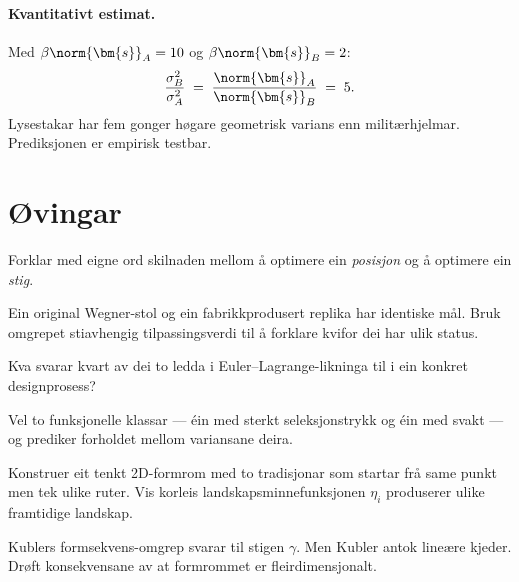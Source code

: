 \paragraph{Kvantitativt estimat.}
Med $\beta \norm{\bm{s}}_A = 10$ og
$\beta \norm{\bm{s}}_B = 2$:
\[
  \frac{\sigma^2_B}{\sigma^2_A}
  \;=\; \frac{\norm{\bm{s}}_A}{\norm{\bm{s}}_B}
  \;=\; 5.
\]
Lysestakar har fem gonger høgare geometrisk varians enn
militærhjelmar. Prediksjonen er empirisk testbar.


\section{Øvingar}

\begin{exercise}[Nivå 1]\label{ex:8.1}
Forklar med eigne ord skilnaden mellom å optimere ein
\emph{posisjon} og å optimere ein \emph{stig}.
\end{exercise}

\begin{exercise}[Nivå 1]\label{ex:8.2}
Ein original Wegner-stol og ein fabrikkprodusert replika har
identiske mål. Bruk omgrepet stiavhengig tilpassingsverdi til å
forklare kvifor dei har ulik status.
\end{exercise}

\begin{exercise}[Nivå 2]\label{ex:8.3}
Kva svarar kvart av dei to ledda i Euler--Lagrange-likninga til i
ein konkret designprosess?
\end{exercise}

\begin{exercise}[Nivå 2]\label{ex:8.4}
Vel to funksjonelle klassar --- éin med sterkt seleksjonstrykk og
éin med svakt --- og prediker forholdet mellom variansane deira.
\end{exercise}

\begin{exercise}[Nivå 3]\label{ex:8.5}
Konstruer eit tenkt 2D-formrom med to tradisjonar som startar frå
same punkt men tek ulike ruter. Vis korleis
landskapsminnefunksjonen $\eta_i$ produserer ulike framtidige
landskap.
\end{exercise}

\begin{exercise}[Nivå 3]\label{ex:8.6}
Kublers formsekvens-omgrep svarar til stigen $\gamma$.
Men Kubler antok lineære kjeder. Drøft konsekvensane av at
formrommet er fleirdimensjonalt.
\end{exercise}


